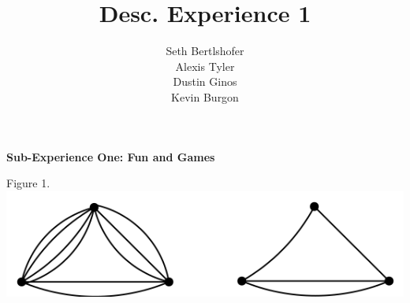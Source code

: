 \documentclass[10pt,a4paper]{report}
\author{Seth Bertlshofer\\Alexis Tyler\\Dustin Ginos\\Kevin Burgon}
\title{Desc. Experience 1}
\begin{document}
	\maketitle
	\textbf{Sub-Experience One: Fun and Games}\\
		\begin{center}
			Figure 1.\\
			\includegraphics[scale=.5]{e1.png}
			\newline
			\newline
		\end{center}
		
\end{document}

